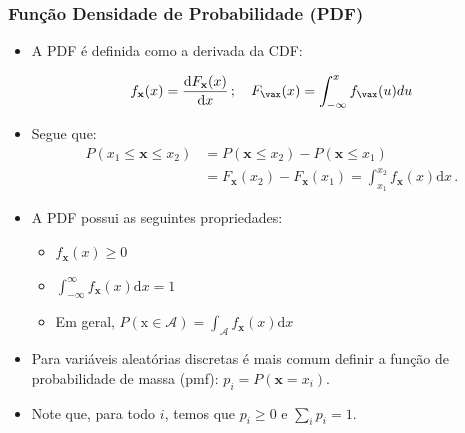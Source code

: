 \begin{frame}
    \frametitle{Função Densidade de Probabilidade (PDF)}
    
    \begin{itemize}
      \item A PDF é definida como a derivada da CDF:

      \begin{equation}
	  f_{\mathbf{x}}(x) = \frac{\mathrm{d} F_{\mathbf{x}}(x)}{ \mathrm{d} x} \, ; \quad F_{\vax}(x) = \int_{-\infty}^{x} f_{\vax}(u) du
      \end{equation}

      \item Segue que:
      \begin{align}
	  P(x_1 \leq \mathbf{x} \leq x_2) &= P(\mathbf{x} \leq x_2) - P(\mathbf{x} \leq x_1) \\
	  &= F_{\mathbf{x}}(x_2) - F_{\mathbf{x}}(x_1) = \int_{x_1}^{x_2}  f_{\mathbf{x}}(x)  \mathrm{d} x \, .
      \end{align}
      
      \item A PDF possui as seguintes propriedades:
      \begin{itemize}
       \item $f_{\mathbf{x}}(x) \geq 0$
	\item $\int_{-\infty}^{\infty} f_{\mathbf{x}}(x) \mathrm{d} x = 1$
	\item Em geral, $P(\mathrm{x} \in \mathcal{A}) = \int_{\mathcal{A}} f_{\mathbf{x}}(x) \mathrm{d} x$
      \end{itemize}

      \item Para variáveis aleatórias discretas é mais comum definir a função de probabilidade de massa (pmf): $p_i = P(\mathbf{x} = x_i)$.

      \item Note que, para todo $i$, temos que $p_i \geq 0$ e $\sum\limits_i p_i = 1$.
    
    \end{itemize}
\end{frame}

